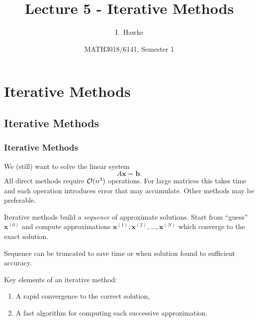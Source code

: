\documentclass{beamer}
\title[Lecture 5] %
{Lecture 5 - Iterative Methods}
\author[I. Hawke] %
{I.~Hawke}
\institute[University of Southampton] %
{
  School of Mathematics, \\
  University of Southampton, UK
}
\date[Semester 1] %
{MATH3018/6141, Semester 1}
\newcommand{\bb}{{\boldsymbol{b}}}
\newcommand{\bx}{{\boldsymbol{x}}}
\begin{document}
\begin{frame}
  \titlepage
\end{frame}

\section{Iterative Methods}

\subsection{Iterative Methods}

\begin{frame}
  \frametitle{Iterative Methods}

   We (still) want to solve the linear system
   \begin{equation*}
     A \bx = \bb.
   \end{equation*}
   All direct methods require ${\cal O}(n^3)$ operations. For large
   matrices this takes time and each operation introduces error that
   may accumulate. Other methods may be preferable. \pause

   \vspace{1ex}

   Iterative methods build a \emph{sequence} of approximate
   solutions. Start from ``guess'' $\bx^{(0)}$ and compute
   approximations $\bx^{(1)}, \bx^{(2)}, \dots, \bx^{(N)}$ which
   converge to the exact solution.

   \vspace{1ex}

   Sequence can be truncated to save time or when solution found to
   sufficient accuracy. \pause

   \vspace{1ex}

   Key elements of an iterative method:
   \begin{enumerate}
   \item A rapid convergence to the correct solution,
   \item A fast algorithm for computing each successive approximation.
   \end{enumerate}

\end{frame}
\end{document}
